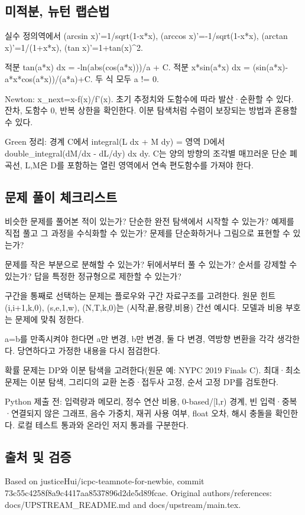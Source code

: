 \documentclass[landscape,8pt,a4paper,twocolumn]{extarticle}
\begin{document}
\subsection{미적분, 뉴턴 랩슨법}
\noindent 실수 정의역에서 (arcsin x)'=1/sqrt(1-x*x), (arccos x)'=-1/sqrt(1-x*x), (arctan x)'=1/(1+x*x), (tan x)'=1+tan(x)\textasciicircum{}2.\par\smallskip
\noindent 적분 tan(a*x) dx = -ln(abs(cos(a*x)))/a + C. 적분 x*sin(a*x) dx = (sin(a*x)-a*x*cos(a*x))/(a*a)+C. 두 식 모두 a != 0.\par\smallskip
\noindent Newton: x\_next=x-f(x)/f'(x). 초기 추정치와 도함수에 따라 발산·순환할 수 있다. 잔차, 도함수 0, 반복 상한을 확인한다. 이분 탐색처럼 수렴이 보장되는 방법과 혼용할 수 있다.\par\smallskip
\noindent Green 정리: 경계 C에서 integral(L dx + M dy) = 영역 D에서 double\_integral(dM/dx - dL/dy) dx dy. C는 양의 방향의 조각별 매끄러운 단순 폐곡선, L,M은 D를 포함하는 열린 영역에서 연속 편도함수를 가져야 한다.\par\smallskip
\subsection{문제 풀이 체크리스트}
\noindent 비슷한 문제를 풀어본 적이 있는가? 단순한 완전 탐색에서 시작할 수 있는가? 예제를 직접 풀고 그 과정을 수식화할 수 있는가? 문제를 단순화하거나 그림으로 표현할 수 있는가?\par\smallskip
\noindent 문제를 작은 부분으로 분해할 수 있는가? 뒤에서부터 풀 수 있는가? 순서를 강제할 수 있는가? 답을 특정한 정규형으로 제한할 수 있는가?\par\smallskip
\noindent 구간을 통째로 선택하는 문제는 플로우와 구간 자료구조를 고려한다. 원문 힌트 (i,i+1,k,0), (s,e,1,w), (N,T,k,0)는 (시작,끝,용량,비용) 간선 예시다. 모델과 비용 부호는 문제에 맞춰 정한다.\par\smallskip
\noindent a=b를 만족시켜야 한다면 a만 변경, b만 변경, 둘 다 변경, 역방향 변환을 각각 생각한다. 당연하다고 가정한 내용을 다시 점검한다.\par\smallskip
\noindent 확률 문제는 DP와 이분 탐색을 고려한다(원문 예: NYPC 2019 Finals C). 최대·최소 문제는 이분 탐색, 그리디의 교환 논증·접두사 고정, 순서 고정 DP를 검토한다.\par\smallskip
\noindent Python 제출 전: 입력량과 메모리, 정수 연산 비용, 0-based/[l,r) 경계, 빈 입력·중복·연결되지 않은 그래프, 음수 가중치, 재귀 사용 여부, float 오차, 해시 충돌을 확인한다. 로컬 테스트 통과와 온라인 저지 통과를 구분한다. \par\smallskip
\subsection{출처 및 검증}
Based on justiceHui/icpc-teamnote-for-newbie, commit 73c55c4258f8a9c4417aa8537896d2de5d89fcae. Original authors/references: docs/UPSTREAM\_README.md and docs/upstream/main.tex.
\end{document}
